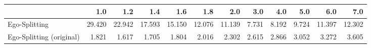 \begin{tabular}{lrrrrrrrrrrr}
\toprule
{} &    1.0 &    1.2 &    1.4 &    1.6 &    1.8 &    2.0 &   3.0 &   4.0 &   5.0 &    6.0 &    7.0 \\
\midrule
Ego-Splitting            & 29.420 & 22.942 & 17.593 & 15.150 & 12.076 & 11.139 & 7.731 & 8.192 & 9.724 & 11.397 & 12.302 \\
Ego-Splitting (original) &  1.821 &  1.617 &  1.705 &  1.804 &  2.016 &  2.302 & 2.615 & 2.866 & 3.052 &  3.272 &  3.605 \\
\bottomrule
\end{tabular}
